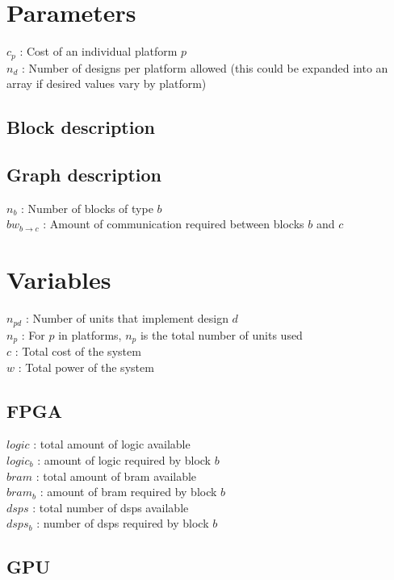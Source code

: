 \documentclass[11pt,letterpaper]{article}
\begin{document}
\section{Parameters}
$c_p$ : Cost of an individual platform $p$ \\
$n_d$ : Number of designs per platform allowed (this could be expanded into an array if desired values vary by platform) \\

\subsection{Block description}

\subsection{Graph description}
$n_b$ : Number of blocks of type $b$ \\
$bw_{b\to c}$ : Amount of communication required between blocks $b$ and $c$

\section{Variables}
$n_{pd}$ : Number of units that implement design $d$ \\
$n_p$ : For $p$ in platforms, $n_p$ is the total number of units used \\
$c$ : Total cost of the system \\
$w$ : Total power of the system \\

\subsection{FPGA}
$logic$ : total amount of logic available \\
$logic_b$ : amount of logic required by block $b$ \\
$bram$ : total amount of bram available \\
$bram_b$ : amount of bram required by block $b$ \\
$dsps$ : total number of dsps available \\
$dsps_b$ : number of dsps required by block $b$ \\


\subsection{GPU}
\end{document}
